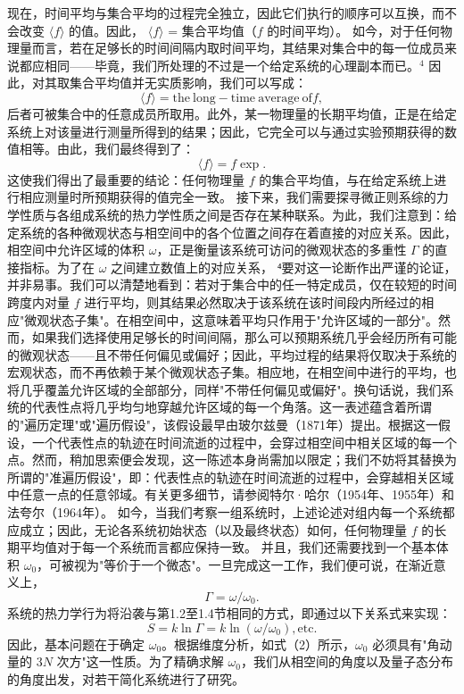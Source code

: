 现在，时间平均与集合平均的过程完全独立，因此它们执行的顺序可以互换，而不会改变 \(\langle f \rangle\) 的值。因此，
\(\langle f \rangle\) = 集合平均值（\(f\) 的时间平均）。
如今，对于任何物理量而言，若在足够长的时间间隔内取时间平均，其结果对集合中的每一位成员来说都应相同——毕竟，我们所处理的不过是一个给定系统的心理副本而已。\(^{4}\) 因此，对其取集合平均值并无实质影响，我们可以写成：
\begin{equation}\tag{2.3.5}\label{eq:2.3.5}
\langle f \rangle = \mathrm { t h e \ l o n g - t i m e \ a v e r a g e \ o f } f ,
\end{equation}
后者可被集合中的任意成员所取用。此外，某一物理量的长期平均值，正是在给定系统上对该量进行测量所得到的结果；因此，它完全可以与通过实验预期获得的数值相等。由此，我们最终得到了：
\begin{equation}\tag{2.3.6}\label{eq:2.3.6}
\langle f \rangle = f \exp .
\end{equation}
这使我们得出了最重要的结论：任何物理量 \(f\) 的集合平均值，与在给定系统上进行相应测量时所预期获得的值完全一致。
接下来，我们需要探寻微正则系综的力学性质与各组成系统的热力学性质之间是否存在某种联系。为此，我们注意到：给定系统的各种微观状态与相空间中的各个位置之间存在着直接的对应关系。因此，相空间中允许区域的体积 \(\omega\)，正是衡量该系统可访问的微观状态的多重性 \(\Gamma\) 的直接指标。为了在 \(\omega\) 之间建立数值上的对应关系，
⁴要对这一论断作出严谨的论证，并非易事。我们可以清楚地看到：若对于集合中的任一特定成员，仅在较短的时间跨度内对量 \(f\) 进行平均，则其结果必然取决于该系统在该时间段内所经过的相应"微观状态子集"。在相空间中，这意味着平均只作用于"允许区域的一部分"。然而，如果我们选择使用足够长的时间间隔，那么可以预期系统几乎会经历所有可能的微观状态——且不带任何偏见或偏好；因此，平均过程的结果将仅取决于系统的宏观状态，而不再依赖于某个微观状态子集。相应地，在相空间中进行的平均，也将几乎覆盖允许区域的全部部分，同样"不带任何偏见或偏好"。换句话说，我们系统的代表性点将几乎均匀地穿越允许区域的每一个角落。这一表述蕴含着所谓的"遍历定理"或"遍历假设"，该假设最早由玻尔兹曼（1871年）提出。根据这一假设，一个代表性点的轨迹在时间流逝的过程中，会穿过相空间中相关区域的每一个点。然而，稍加思索便会发现，这一陈述本身尚需加以限定；我们不妨将其替换为所谓的"准遍历假设"，即：代表性点的轨迹在时间流逝的过程中，会穿越相关区域中任意一点的任意邻域。有关更多细节，请参阅特尔·哈尔（1954年、1955年）和法夸尔（1964年）。
如今，当我们考察一组系统时，上述论述对组内每一个系统都应成立；因此，无论各系统初始状态（以及最终状态）如何，任何物理量 \(f\) 的长期平均值对于每一个系统而言都应保持一致。
并且，我们还需要找到一个基本体积 \(\omega_{0}\)，可被视为"等价于一个微态"。一旦完成这一工作，我们便可说，在渐近意义上，
\begin{equation}\tag{2.3.7}\label{eq:2.3.7}
\Gamma = \omega / \omega _ { 0 } .
\end{equation}
系统的热力学行为将沿袭与第1.2至1.4节相同的方式，即通过以下关系式来实现：
\begin{equation}\tag{2.3.8}\label{eq:2.3.8}
S = k \ln \Gamma = k \ln ( \omega / \omega _ { 0 } ) ,  \mathrm { e t c . }
\end{equation}
因此，基本问题在于确定 \(\omega_{0}\)。根据维度分析，如式（2）所示，\(\omega_{0}\) 必须具有"角动量的 \(3N\) 次方"这一性质。为了精确求解 \(\omega_{0}\)，我们从相空间的角度以及量子态分布的角度出发，对若干简化系统进行了研究。
